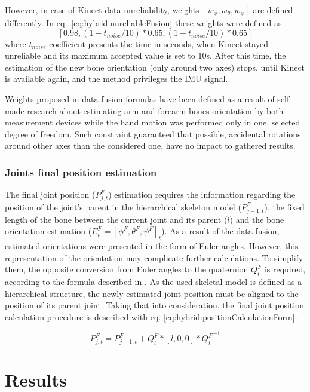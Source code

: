 \documentclass[sensors,article,submit,moreauthors,pdftex,10pt,a4paper]{mdpi}
\begin{document}
However, in case of Kinect data unreliability, weights $[w_\phi , w_\theta , w_\psi]$ are defined differently. In eq.~\ref{eq:hybrid:unreliableFusion} these weights were defined as $$[0.98,(1-t_{noise}/10)*0.65,(1-t_{noise}/10)*0.65]$$ where $t_{noise}$ coefficient presents the time in seconds, when Kinect stayed unreliable and its maximum accepted value is set to 10s. After this time, the estimation of the new bone orientation (only around two axes) stops, until Kinect is available again, and the method privileges the IMU signal.

Weights proposed in data fusion formulas have been defined as a result of self made research about estimating arm and forearm bones orientation by both measurement devices while the hand motion was performed only in one, selected degree of freedom. Such constraint guaranteed that possible, accidental rotations around other axes than the considered one, have no impact to gathered results.
		
\subsubsection{Joints final position estimation}
The final joint position ($P_{j,t}^F$) estimation requires the information regarding the position of the joint’s parent in the hierarchical skeleton model ($P_{j-1,t}^F$), the fixed length of the bone between the current joint and its parent ($l$) and the bone orientation estimation ($E_t^F=[\phi^F,\theta^F,\psi^F]_t$). As a result of the data fusion, estimated orientations were presented in the form of Euler angles. However, this representation of the orientation may complicate further calculations. To simplify them, the opposite conversion from Euler angles to the quaternion $Q_t^F$ is required, according to the formula described in \cite{Dunn2011}. As the used skeletal model is defined as a hierarchical structure, the newly estimated joint position must be aligned to the position of its parent joint. Taking that into consideration, the final joint position calculation procedure is described with eq. \ref{eq:hybrid:positionCalculationForm}.
		
\begin{equation} 	
	P_{j,t}^F=P_{j-1,t}^F+Q_t^F*[l,0,0]*{Q_t^F}^{-1}     
	\label{eq:hybrid:positionCalculationForm}              	
\end{equation}
		
\section{Results}
		
\end{document}
